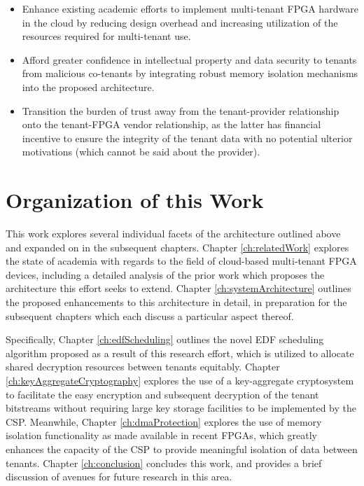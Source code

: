 \begin{itemize}
    \item Enhance existing academic efforts to implement multi-tenant FPGA hardware in the cloud by reducing design overhead and increasing utilization of the resources required for multi-tenant use.
    \item Afford greater confidence in intellectual property and data security to tenants from malicious co-tenants by integrating robust memory isolation mechanisms into the proposed architecture.
    \item Transition the burden of trust away from the tenant-provider relationship onto the tenant-FPGA vendor relationship, as the latter has financial incentive to ensure the integrity of the tenant data with no potential ulterior motivations (which cannot be said about the provider).
\end{itemize}

\section{Organization of this Work}\label{sec:organization}
This work explores several individual facets of the architecture outlined above and expanded on in the subsequent chapters. Chapter \ref{ch:relatedWork} explores the state of academia with regards to the field of cloud-based multi-tenant FPGA devices, including a detailed analysis of the prior work which proposes the architecture this effort seeks to extend. Chapter \ref{ch:systemArchitecture} outlines the proposed enhancements to this architecture in detail, in preparation for the subsequent chapters which each discuss a particular aspect thereof.

Specifically, Chapter \ref{ch:edfScheduling} outlines the novel EDF scheduling algorithm proposed as a result of this research effort, which is utilized to allocate shared decryption resources between tenants equitably. Chapter \ref{ch:keyAggregateCryptography} explores the use of a key-aggregate cryptosystem to facilitate the easy encryption and subsequent decryption of the tenant bitstreams without requiring large key storage facilities to be implemented by the CSP. Meanwhile, Chapter \ref{ch:dmaProtection} explores the use of memory isolation functionality as made available in recent FPGAs, which greatly enhances the capacity of the CSP to provide meaningful isolation of data between tenants.  Chapter \ref{ch:conclusion} concludes this work, and provides a brief discussion of avenues for future research in this area.